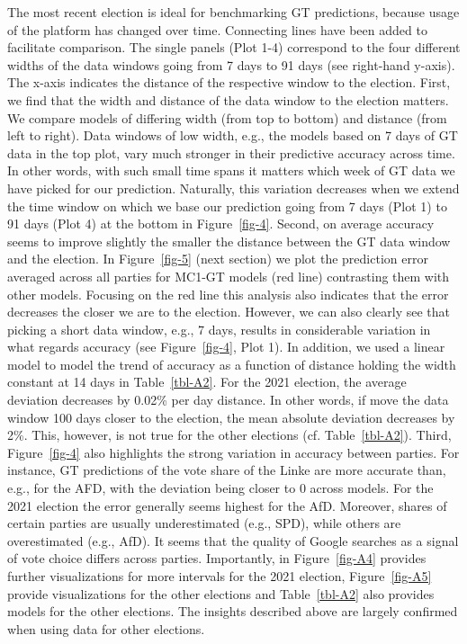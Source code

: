 \documentclass[
  letterpaper,
  DIV=11,
  numbers=noendperiod]{scrartcl}
\begin{document}
The most recent election is ideal for benchmarking GT predictions,
because usage of the platform has changed over time. Connecting lines
have been added to facilitate comparison. The single panels (Plot 1-4)
correspond to the four different widths of the data windows going from 7
days to 91 days (see right-hand y-axis). The x-axis indicates the
distance of the respective window to the election. First, we find that
the width and distance of the data window to the election matters. We
compare models of differing width (from top to bottom) and distance
(from left to right). Data windows of low width, e.g., the models based
on 7 days of GT data in the top plot, vary much stronger in their
predictive accuracy across time. In other words, with such small time
spans it matters which week of GT data we have picked for our
prediction. Naturally, this variation decreases when we extend the time
window on which we base our prediction going from 7 days (Plot 1) to 91
days (Plot 4) at the bottom in Figure~\ref{fig-4}. Second, on average
accuracy seems to improve slightly the smaller the distance between the
GT data window and the election. In Figure~\ref{fig-5} (next section) we
plot the prediction error averaged across all parties for MC1-GT models
(red line) contrasting them with other models. Focusing on the red line
this analysis also indicates that the error decreases the closer we are
to the election. However, we can also clearly see that picking a short
data window, e.g., 7 days, results in considerable variation in what
regards accuracy (see Figure~\ref{fig-4}, Plot 1). In addition, we used
a linear model to model the trend of accuracy as a function of distance
holding the width constant at 14 days in Table~\ref{tbl-A2}. For the
2021 election, the average deviation decreases by 0.02\% per day
distance. In other words, if move the data window 100 days closer to the
election, the mean absolute deviation decreases by 2\%. This, however,
is not true for the other elections (cf. Table~\ref{tbl-A2}). Third,
Figure~\ref{fig-4} also highlights the strong variation in accuracy
between parties. For instance, GT predictions of the vote share of the
Linke are more accurate than, e.g., for the AFD, with the deviation
being closer to 0 across models. For the 2021 election the error
generally seems highest for the AfD. Moreover, shares of certain parties
are usually underestimated (e.g., SPD), while others are overestimated
(e.g., AfD). It seems that the quality of Google searches as a signal of
vote choice differs across parties. Importantly, in Figure~\ref{fig-A4}
provides further visualizations for more intervals for the 2021
election, Figure~\ref{fig-A5} provide visualizations for the other
elections and Table~\ref{tbl-A2} also provides models for the other
elections. The insights described above are largely confirmed when using
data for other elections.
\end{document}
